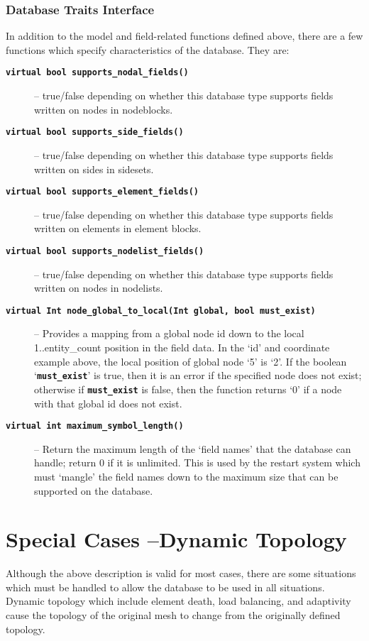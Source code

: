 \documentclass[11pt,twoside]{article}
\newcommand{\code}[1]
   {\mbox{\bf\tt #1}\null}
\begin{document}
\subsubsection{Database Traits Interface}
In addition to the model and field{}-related functions defined above,
there are a few functions which specify characteristics of the
database. They are:

\begin{description}
\item [\code{virtual bool  supports\_nodal\_fields()}]--
true/false depending on whether this database type supports fields
written on nodes in nodeblocks.
\item [\code{virtual bool  supports\_side\_fields()}]-- true/false
depending on whether this database type supports fields written on
sides in sidesets.
\item [\code{virtual bool  supports\_element\_fields()}]--
true/false depending on whether this database type supports fields
written on elements in element blocks.
\item [\code{virtual bool  supports\_nodelist\_fields()}]--
true/false depending on whether this database type supports fields
written on nodes in nodelists.
\item [\code{virtual Int  node\_global\_to\_local(Int global, bool
must\_exist)}]-- Provides a mapping from a global node id down to
the local 1..entity\_count position in the field data. In the `id' and
coordinate example above, the local position of global node `5' is `2'.
If the boolean `\code{must\_exist}' is true, then it is an
error if the specified node does not exist; otherwise if
\code{must\_exist} is false, then the function returns `0' if
a node with that global id does not exist. 
\item [\code{virtual int  maximum\_symbol\_length()}]-- Return
the maximum length of the `field names' that the database can handle;
return 0 if it is unlimited. This is used by the restart system which
must `mangle' the field names down to the maximum size that can be
supported on the database.
\end{description}
\section{Special Cases --Dynamic Topology}
Although the above description is valid for most cases, there are some
situations which must be handled to allow the database to be used in
all situations. Dynamic topology which include element death, load
balancing, and adaptivity cause the topology of the original mesh to
change from the originally defined topology.
\end{document}
